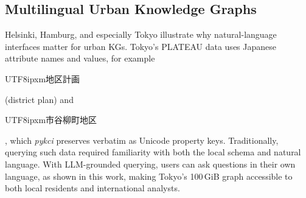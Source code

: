 \documentclass[sigconf,authordraft]{acmart}
\newcommand{\jp}[1]{\begin{CJK}{UTF8}{ipxm}#1\end{CJK}}
\newcommand{\mytoolname}{\textit{pykci}}
\newcommand{\benchname}{\textit{Authenti\-City}}
\begin{document}
\subsection{Multilingual Urban Knowledge Graphs}\label{subsec:multilingual}

Helsinki, Hamburg, and especially Tokyo illustrate why natural-language interfaces matter for urban KGs. Tokyo's PLATEAU data uses Japanese attribute names and values, for example \jp{地区計画} (district plan) and \jp{市谷柳町地区}, which \mytoolname{} preserves verbatim as Unicode property keys. Traditionally, querying such data required familiarity with both the local schema and natural language. With LLM-grounded querying, users can ask questions in their own language, 
as shown in this work, making Tokyo's 100\,GiB graph accessible to both local residents and international analysts.



\end{document}
